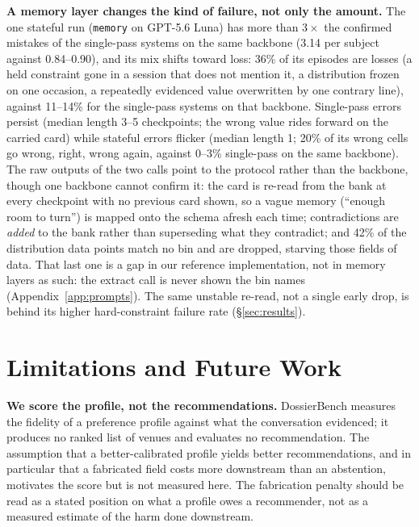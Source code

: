 \documentclass{article}
\newcommand{\bench}{DossierBench}
\begin{document}
\textbf{A memory layer changes the kind of failure, not only the amount.} The one stateful run
(\texttt{memory} on GPT-5.6 Luna) has more than $3\times$ the confirmed mistakes of the single-pass
systems on the same backbone (3.14 per subject against 0.84--0.90), and its mix shifts toward loss:
36\% of its episodes are losses (a held constraint gone in a session that does not mention it, a
distribution frozen on one occasion, a repeatedly evidenced value overwritten by one contrary line),
against 11--14\% for the single-pass systems on that backbone. Single-pass errors persist (median
length 3--5 checkpoints; the wrong value rides forward on the carried card) while stateful errors flicker
(median length 1; 20\% of its wrong cells go wrong, right, wrong again, against 0--3\% single-pass on
the same backbone). The raw outputs of the two calls point to the protocol rather than the backbone, though one
backbone cannot confirm it:
the card is re-read from the bank at every checkpoint with no
previous card shown, so a vague memory (``enough room to turn'') is mapped onto the schema afresh
each time; contradictions are \emph{added} to the bank rather than superseding what they contradict;
and 42\% of the distribution data points match no bin and are dropped, starving those fields of
data. That last one is a gap in our reference implementation, not in memory layers as such: the
extract call is never shown the bin names (Appendix~\ref{app:prompts}). The same unstable re-read, not a single early drop, is behind its
higher hard-constraint failure rate (\S\ref{sec:results}).

\section{Limitations and Future Work}
\label{sec:limits}

\textbf{We score the profile, not the recommendations.} \bench{} measures the fidelity of a
preference profile against what the conversation evidenced; it produces no ranked list of venues and
evaluates no recommendation. The assumption that a better-calibrated profile yields better
recommendations, and in particular that a fabricated field costs more downstream than an abstention,
motivates the score but is not measured here. The fabrication penalty
should be read as a stated position on what a profile owes a recommender, not as a measured
estimate of the harm done downstream.
\end{document}

